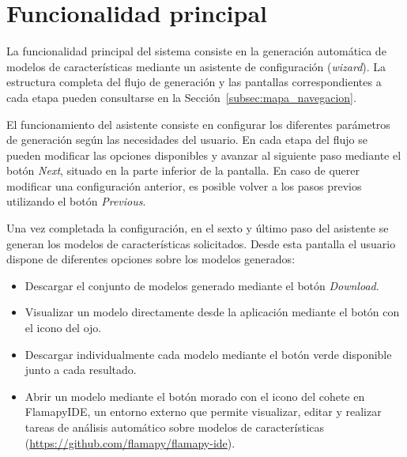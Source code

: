 \section{Funcionalidad principal}
\label{sec:funcionalidad_principal}



La funcionalidad principal del sistema consiste en la generación automática de
modelos de características mediante un asistente de configuración
(\textit{wizard}). La estructura completa del flujo de generación y las
pantallas correspondientes a cada etapa pueden consultarse en la
Sección~\ref{subsec:mapa_navegacion}.

El funcionamiento del asistente consiste en configurar los diferentes
parámetros de generación según las necesidades del usuario. En cada etapa del
flujo se pueden modificar las opciones disponibles y avanzar al siguiente paso
mediante el botón \textit{Next}, situado en la parte inferior de la pantalla.
En caso de querer modificar una configuración anterior, es posible volver a
los pasos previos utilizando el botón \textit{Previous}.

Una vez completada la configuración, en el sexto y último paso del asistente se generan
los modelos de características solicitados. Desde esta pantalla el usuario
dispone de diferentes opciones sobre los modelos generados:
\begin{itemize}
    \item Descargar el conjunto de modelos generado mediante el botón
    \textit{Download}.
    \item Visualizar un modelo directamente desde la aplicación mediante el
    botón con el icono del ojo.
    \item Descargar individualmente cada modelo mediante el botón verde
    disponible junto a cada resultado.
    \item Abrir un modelo mediante el botón morado con el icono del
    cohete en FlamapyIDE, un entorno externo que permite visualizar, editar y
    realizar tareas de análisis automático sobre modelos de características
    (\url{https://github.com/flamapy/flamapy-ide}).
\end{itemize}

